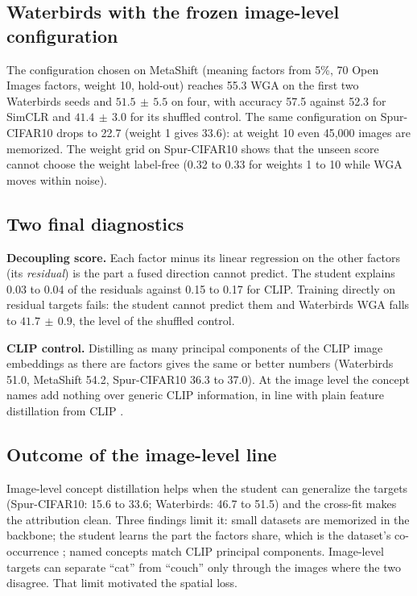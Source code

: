 \documentclass[11pt]{article}
\newcommand{\pmsd}[2]{$#1{\scriptstyle\,\pm\,#2}$}
\begin{document}
\subsection{Waterbirds with the frozen image-level configuration}
The configuration chosen on MetaShift (meaning factors from 5\%, 70 Open Images factors, weight 10, hold-out)
reaches 55.3 WGA on the first two Waterbirds seeds and \pmsd{51.5}{5.5} on four, with accuracy 57.5 against 52.3
for SimCLR and \pmsd{41.4}{3.0} for its shuffled control. The same configuration on Spur-CIFAR10 drops to 22.7
(weight 1 gives 33.6): at weight 10 even 45,000 images are memorized. The weight grid on Spur-CIFAR10 shows that
the unseen score cannot choose the weight label-free (0.32 to 0.33 for weights 1 to 10 while WGA moves within
noise).

\subsection{Two final diagnostics}
\textbf{Decoupling score.} Each factor minus its linear regression on the other factors (its \emph{residual}) is
the part a fused direction cannot predict. The student explains 0.03 to 0.04 of the residuals against 0.15 to
0.17 for CLIP. Training directly on residual targets fails: the student cannot predict them and Waterbirds WGA
falls to \pmsd{41.7}{0.9}, the level of the shuffled control.

\textbf{CLIP control.} Distilling as many principal components of the CLIP image embeddings as there are factors
gives the same or better numbers (Waterbirds 51.0, MetaShift 54.2, Spur-CIFAR10 36.3 to 37.0). At the image level
the concept names add nothing over generic CLIP information, in line with plain feature distillation from CLIP
\citep{yang2024clipkd}.

\subsection{Outcome of the image-level line}
Image-level concept distillation helps when the student can generalize the targets (Spur-CIFAR10: 15.6 to 33.6;
Waterbirds: 46.7 to 51.5) and the cross-fit makes the attribution clean. Three findings limit it: small
datasets are memorized in the backbone; the student learns the part the factors share, which is the dataset's
co-occurrence \citep{trauble2021correlated}; named concepts match CLIP principal components. Image-level targets
can separate ``cat'' from ``couch'' only through the images where the two disagree. That limit motivated the
spatial loss.
\end{document}
